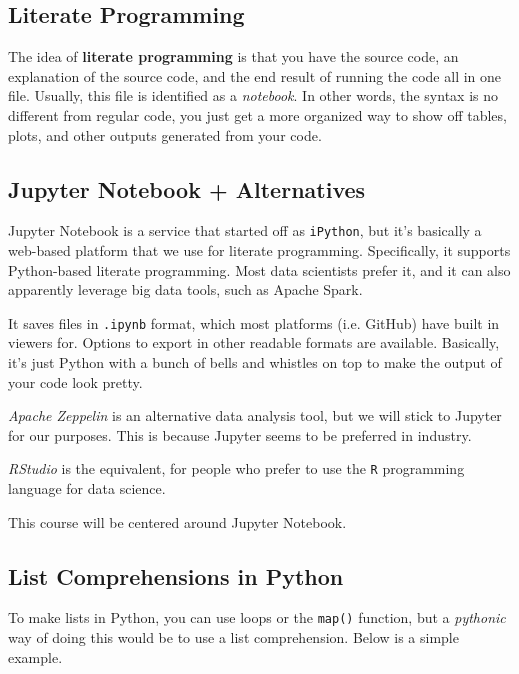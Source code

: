 \documentclass[english, 10pt]{article}
\begin{document}
\subsection{Literate Programming}

The idea of \textbf{literate programming} is that you have the source code, an explanation of the source code, and the end result of running the code all in one file. Usually, this file is identified as a \textit{notebook}. In other words, the syntax is no different from regular code, you just get a more organized way to show off tables, plots, and other outputs generated from your code.

\subsection{Jupyter Notebook + Alternatives}

Jupyter Notebook is a service that started off as \texttt{iPython}, but it's basically a web-based platform that we use for literate programming. Specifically, it supports Python-based literate programming. Most data scientists prefer it, and it can also apparently leverage big data tools, such as Apache Spark.\newline

It saves files in \texttt{.ipynb} format, which most platforms (i.e. GitHub) have built in viewers for. Options to export in other readable formats are available. Basically, it's just Python with a bunch of bells and whistles on top to make the output of your code look pretty.\newline

\textit{Apache Zeppelin} is an alternative data analysis tool, but we will stick to Jupyter for our purposes. This is because Jupyter seems to be preferred in industry.\newline

\textit{RStudio} is the equivalent, for people who prefer to use the \texttt{R} programming language for data science.\newline

This course will be centered around Jupyter Notebook.

\subsection{List Comprehensions in Python}

To make lists in Python, you can use loops or the \texttt{map()} function, but a \textit{pythonic} way of doing this would be to use a list comprehension. Below is a simple example.\newline
\end{document}
